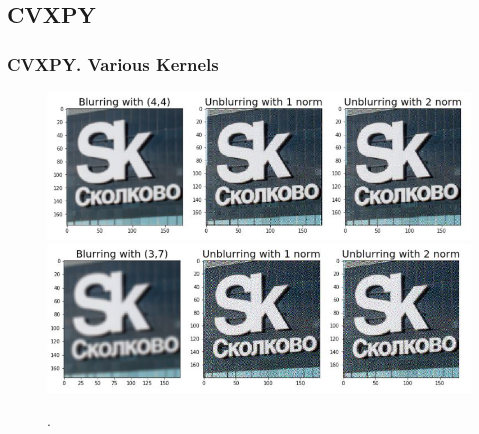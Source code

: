 \documentclass[hyperref={pdfpagelabels=false}]{beamer}
\begin{document}
\subsection{CVXPY}
\begin{frame}
\frametitle{CVXPY. Various Kernels}

\begin{center}
\begin{figure}[h]
\begin{adjustwidth}{-0.2cm}{-0.5 cm}
\includegraphics[scale=0.53]{4_4.jpg} \\
\includegraphics[scale=0.53]{3_7.jpg} \\
\end{adjustwidth}
\caption{.}
\end{figure}
\end{center}

\end{frame}
\end{document}
